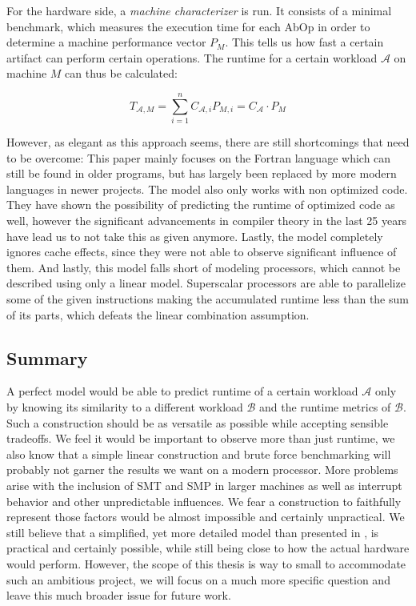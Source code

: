 \documentclass[../bachelor_paper.tex]{subfiles}
\begin{document}
For the hardware side, a \emph{machine characterizer} is run. It consists of a minimal benchmark, which measures the execution time for each \ac{AbOp} in order to determine a machine performance vector $P_M$. This tells us how fast a certain artifact can perform certain operations. The runtime for a certain workload $\mathcal{A}$ on machine $M$ can thus be calculated:

\begin{equation}
\label{eq:theo/simi/hybr/mode}
T_{\mathcal{A},M} = \sum^n_{i = 1}C_{\mathcal{A},i}P_{M,i} = C_\mathcal{A} \cdot P_M
\end{equation}

However, as elegant as this approach seems, there are still shortcomings that need to be overcome: This paper mainly focuses on the Fortran language which can still be found in older programs, but has largely been replaced by more modern languages in newer projects. The model also only works with non optimized code. They have shown the possibility of predicting the runtime of optimized code as well, however the significant advancements in compiler theory in the last 25 years have lead us to not take this as given anymore. Lastly, the model completely ignores cache effects, since they were not able to observe significant influence of them. And lastly, this model falls short of modeling processors, which cannot be described using only a linear model. Superscalar processors are able to parallelize some of the given instructions making the accumulated runtime less than the sum of its parts, which defeats the linear combination assumption.

\subsection{Summary}
	\label{ch:theo/simi/summ}
A perfect model would be able to predict runtime of a certain workload $\mathcal{A}$ only by knowing its similarity to a different workload $\mathcal{B}$ and the runtime metrics of $\mathcal{B}$. Such a construction should be as versatile as possible while accepting sensible tradeoffs. We feel it would be important to observe more than just runtime, we also know that a simple linear construction and brute force benchmarking will probably not garner the results we want on a modern processor. More problems arise with the inclusion of \ac{SMT} and \ac{SMP} in larger machines as well as interrupt behavior and other unpredictable influences. We fear a construction to faithfully represent those factors would be almost impossible and certainly unpractical. 
We still believe that a simplified, yet more detailed model than presented in \cite{saavedraAnalysisBenchmarkCharacteristics1996}, is practical and certainly possible, while still being close to how the actual hardware would perform. However, the scope of this thesis is way to small to accommodate such an ambitious project, we will focus on a much more specific question and leave this much broader issue for future work.
\end{document}
